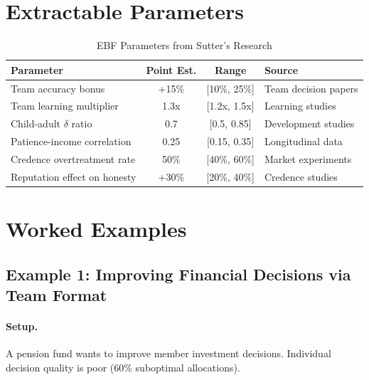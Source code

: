 \section{Extractable Parameters}
\label{sec:sut-parameters}

\begin{table}[htbp]
\centering
\caption{EBF Parameters from Sutter's Research}
\label{tab:sut-params}
\renewcommand{\arraystretch}{1.4}
\begin{tabular}{@{}lccl@{}}
\toprule
\textbf{Parameter} & \textbf{Point Est.} & \textbf{Range} & \textbf{Source} \\
\midrule
Team accuracy bonus & +15\% & [10\%, 25\%] & Team decision papers \\
Team learning multiplier & 1.3x & [1.2x, 1.5x] & Learning studies \\
Child-adult $\delta$ ratio & 0.7 & [0.5, 0.85] & Development studies \\
Patience-income correlation & 0.25 & [0.15, 0.35] & Longitudinal data \\
Credence overtreatment rate & 50\% & [40\%, 60\%] & Market experiments \\
Reputation effect on honesty & +30\% & [20\%, 40\%] & Credence studies \\
\bottomrule
\end{tabular}
\end{table}


\section{Worked Examples}
\label{sec:sut-examples}

\subsection{Example 1: Improving Financial Decisions via Team Format}

\paragraph{Setup.} A pension fund wants to improve member investment decisions.
Individual decision quality is poor (60\% suboptimal allocations).

